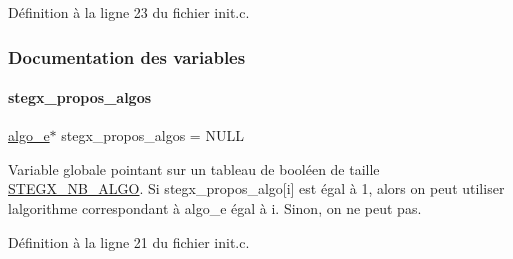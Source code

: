 Définition à la ligne 23 du fichier init.\+c.



\subsubsection{Documentation des variables}
\mbox{\label{a00107_a855163fecb257950934ffba1b73ecae4}} 
\paragraph{\texorpdfstring{stegx\+\_\+propos\+\_\+algos}{stegx\_propos\_algos}}
{\footnotesize\ttfamily \hyperlink{a00008_adbe3e383e3f1c4239b26ccae2865aa06}{algo\+\_\+e}$\ast$ stegx\+\_\+propos\+\_\+algos = N\+U\+LL}

Variable globale pointant sur un tableau de booléen de taille \hyperlink{a00008_ad3066b71c7c05f99ce6c3bd88da7ac23a6266bb55785ce37f799cb062cb11b2a4}{S\+T\+E\+G\+X\+\_\+\+N\+B\+\_\+\+A\+L\+GO}. Si stegx\+\_\+propos\+\_\+algo\mbox{[}i\mbox{]} est égal à 1, alors on peut utiliser l\textquotesingle{}algorithme correspondant à algo\+\_\+e égal à i. Sinon, on ne peut pas. 

Définition à la ligne 21 du fichier init.\+c.

